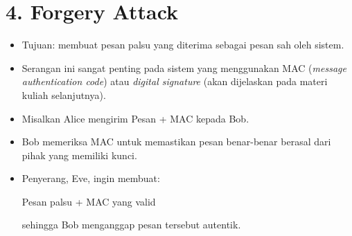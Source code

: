 \documentclass{article}
\begin{document}

\section*{4. Forgery Attack}

\begin{itemize}
    \item Tujuan: membuat pesan palsu yang diterima sebagai pesan sah oleh sistem.
    \item Serangan ini sangat penting pada sistem yang menggunakan MAC (\textit{message authentication code}) atau \textit{digital signature} (akan dijelaskan pada materi kuliah selanjutnya).
    \item Misalkan Alice mengirim Pesan + MAC kepada Bob.
    \item Bob memeriksa MAC untuk memastikan pesan benar-benar berasal dari pihak yang memiliki kunci.
    \item Penyerang, Eve, ingin membuat:
    
    Pesan palsu + MAC yang valid
    
    sehingga Bob menganggap pesan tersebut autentik.
\end{itemize}
\end{document}
